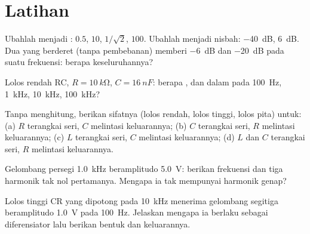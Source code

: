 \section{Latihan}

\begin{exercise}[$\star$]\label{exo:b1:filters-transfer-functions:1}
Ubahlah menjadi :  $0.5$, $10$, $1/\sqrt2$, $100$.
Ubahlah menjadi nisbah: \qty{-40}{dB}, \qty{+6}{dB}. Dua  yang
berderet (tanpa pembebanan) memberi \qty{-6}{dB} dan \qty{-20}{dB} pada
suatu frekuensi: berapa  keseluruhannya?
\end{exercise}

\begin{exercise}[$\star$]\label{exo:b1:filters-transfer-functions:2}
Lolos rendah RC, $R = \qty{10}{k\ohm}$, $C = \qty{16}{nF}$: berapa
, dan  dalam  pada \qty{100}{Hz},
\qty{1}{kHz}, \qty{10}{kHz}, \qty{100}{kHz}?
\end{exercise}

\begin{exercise}[$\star$]\label{exo:b1:filters-transfer-functions:3}
Tanpa menghitung, berikan sifatnya (lolos rendah, lolos tinggi, lolos
pita) untuk: (a) $R$ terangkai seri, $C$ melintasi keluarannya; (b) $C$
terangkai seri, $R$ melintasi keluarannya; (c) $L$ terangkai seri, $C$
melintasi keluarannya; (d) $L$ dan $C$ terangkai seri, $R$ melintasi
keluarannya.
\end{exercise}

\begin{exercise}[$\star$]\label{exo:b1:filters-transfer-functions:4}
Gelombang persegi \qty{1.0}{kHz} beramplitudo \qty{5.0}{V}: berikan
frekuensi dan  tiga harmonik tak nol pertamanya. Mengapa ia
tak mempunyai harmonik genap?
\end{exercise}

\begin{exercise}[$\star\star$]\label{exo:b1:filters-transfer-functions:5}
Lolos tinggi CR yang dipotong pada \qty{10}{kHz} menerima gelombang
segitiga beramplitudo \qty{1.0}{V} pada \qty{100}{Hz}. Jelaskan mengapa
ia berlaku sebagai diferensiator lalu berikan bentuk dan  keluarannya.
\end{exercise}

